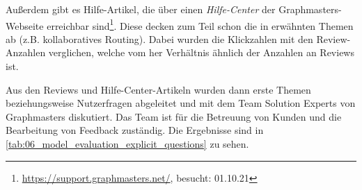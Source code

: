 
Außerdem gibt es Hilfe-Artikel, die über einen \textit{Hilfe-Center} der Graphmasters-Webseite erreichbar sind\footnote{\url{https://support.graphmasters.net/}, besucht: 01.10.21}. Diese decken zum Teil schon die in  erwähnten Themen ab (z.B. kollaboratives Routing). Dabei wurden die Klickzahlen mit den Review-Anzahlen verglichen, welche vom her Verhältnis ähnlich der Anzahlen an Reviews ist.


Aus den Reviews und Hilfe-Center-Artikeln wurden dann erste Themen beziehungsweise Nutzerfragen abgeleitet und mit dem Team \glqq Solution Experts\grqq{} von Graphmasters diskutiert. Das Team ist für die Betreuung von Kunden und die Bearbeitung von Feedback zuständig. Die Ergebnisse sind in \autoref{tab:06_model_evaluation_explicit_questions} zu sehen.

